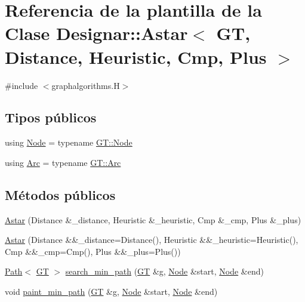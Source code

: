 \hypertarget{class_designar_1_1_astar}{}\section{Referencia de la plantilla de la Clase Designar\+:\+:Astar$<$ GT, Distance, Heuristic, Cmp, Plus $>$}
\label{class_designar_1_1_astar}


{\ttfamily \#include $<$graphalgorithms.\+H$>$}

\subsection*{Tipos públicos}
\begin{DoxyCompactItemize}
\item 
using \hyperlink{class_designar_1_1_astar_a0d4cdf6b94255824c6c93e5ae18e9eb7}{Node} = typename \hyperlink{class_designar_1_1_graph_a5dfc7dba9d092ac489c72e40390c37d0}{G\+T\+::\+Node}
\item 
using \hyperlink{class_designar_1_1_astar_a4d0b1c7cb0a71b5cfe3d21ea37c12108}{Arc} = typename \hyperlink{class_designar_1_1_graph_a74c730ef4ce2d20f998d72bd25c2b5bf}{G\+T\+::\+Arc}
\end{DoxyCompactItemize}
\subsection*{Métodos públicos}
\begin{DoxyCompactItemize}
\item 
\hyperlink{class_designar_1_1_astar_a9a684bbaa799da107f42ed8e048cac57}{Astar} (Distance \&\+\_\+distance, Heuristic \&\+\_\+heuristic, Cmp \&\+\_\+cmp, Plus \&\+\_\+plus)
\item 
\hyperlink{class_designar_1_1_astar_a5db848d589e8e4ce7582acc061cb8b17}{Astar} (Distance \&\&\+\_\+distance=Distance(), Heuristic \&\&\+\_\+heuristic=Heuristic(), Cmp \&\&\+\_\+cmp=Cmp(), Plus \&\&\+\_\+plus=Plus())
\item 
\hyperlink{class_designar_1_1_path}{Path}$<$ \hyperlink{demo-buildgraph_8_c_a3001c40d2c31ca87ed96cd7d1334a55e}{GT} $>$ \hyperlink{class_designar_1_1_astar_a23f41f4dd26aaef8ded7138de8866b54}{search\+\_\+min\+\_\+path} (\hyperlink{demo-buildgraph_8_c_a3001c40d2c31ca87ed96cd7d1334a55e}{GT} \&g, \hyperlink{class_designar_1_1_astar_a0d4cdf6b94255824c6c93e5ae18e9eb7}{Node} \&start, \hyperlink{class_designar_1_1_astar_a0d4cdf6b94255824c6c93e5ae18e9eb7}{Node} \&end)
\item 
void \hyperlink{class_designar_1_1_astar_ab6cf1a92f64a96290880a1483eac396f}{paint\+\_\+min\+\_\+path} (\hyperlink{demo-buildgraph_8_c_a3001c40d2c31ca87ed96cd7d1334a55e}{GT} \&g, \hyperlink{class_designar_1_1_astar_a0d4cdf6b94255824c6c93e5ae18e9eb7}{Node} \&start, \hyperlink{class_designar_1_1_astar_a0d4cdf6b94255824c6c93e5ae18e9eb7}{Node} \&end)
\end{DoxyCompactItemize}


